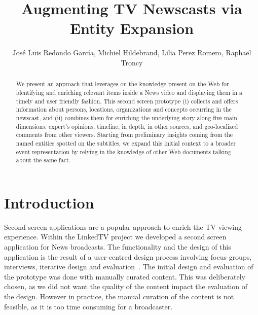 \documentclass{llncs}
\begin{document}
\frontmatter          %
\pagestyle{headings}  %
\mainmatter              %

\title{Augmenting TV Newscasts via Entity Expansion}
\author{Jos\'e Luis Redondo Garc\'ia, Michiel Hildebrand, Lilia Perez Romero, Rapha\"el Troncy}


\maketitle              %


\begin{abstract}
We present an approach that leverages on the knowledge present on the Web for identifying and enriching relevant items inside a News video and displaying them in a timely and user friendly fashion. 
This second screen prototype (i) collects and offers information about persons, locations, organizations and concepts occurring in the newscast, and (ii) combines them for enriching the underlying story along five main dimensions: expert's opinions, timeline, in depth, in other sources, and geo-localized comments from other viewers.  
Starting from preliminary insights coming from the named entities spotted on the subtitles, we expand this initial context to a broader event representation by relying in the knowledge of other Web documents talking about the same fact. 


\end{abstract}


\section{Introduction}
Second screen applications are a popular approach to enrich the TV viewing experience. Within the LinkedTV project we developed a second screen application for News broadcasts. The functionality and the design of this application is the result of a user-centred design process involving focus groups, interviews, iterative design and evaluation~\cite{lilia2013}. The initial design and evaluation of the prototype was done with manually curated content. This was deliberately chosen, as we did not want the quality of the content impact the evaluation of the design. However in practice, the manual curation of the content is not feasible, as it is too time consuming for a broadcaster.
\end{document}
